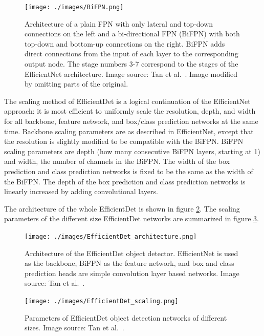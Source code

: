 \documentclass[english,twoside,openright]{HYgraduMLDS}
\begin{document}
\begin{figure}[h] 
\centering
\texttt{[image: ./images/BiFPN.png]}
\caption{Architecture of a plain FPN with only lateral and top-down connections on the left and a bi-directional FPN (BiFPN) with both top-down and bottom-up connections on the right. BiFPN adds direct connections from the input of each layer to the corresponding output node. The stage numbers 3-7 correspond to the stages of the EfficientNet architecture. Image source: Tan et al.~\cite{EfficientDet}. Image modified by omitting parts of the original.}
\label{fig:BiFPN} 
\end{figure}

The scaling method of EfficientDet is a logical continuation of the EfficientNet approach: it is most efficient to uniformly scale the resolution, depth, and width for all backbone, feature network, and box/class prediction networks at the same time. Backbone scaling parameters are as described in EfficientNet, except that the resolution is slightly modified to be compatible with the BiFPN. BiFPN scaling parameters are depth (how many consecutive BiFPN layers, starting at 1) and width, the number of channels in the BiFPN. The width of the box prediction and class prediction networks is fixed to be the same as the width of the BiFPN. The depth of the box prediction and class prediction networks is linearly increased by adding convolutional layers.  

The architecture of the whole EfficientDet is shown in figure \ref{fig:EfficientDet_architecture}. The scaling parameters of the different size EfficientDet networks are summarized in figure \ref{fig:EfficientDet_scaling}.

\begin{figure}[h] 
\centering
\texttt{[image: ./images/EfficientDet\_architecture.png]}
\caption{Architecture of the EfficientDet object detector. EfficientNet is used as the backbone, BiFPN as the feature network, and box and class prediction heads are simple convolution layer based networks. Image source: Tan et al.~\cite{EfficientDet}.}
\label{fig:EfficientDet_architecture} 
\end{figure}

\begin{figure}[h] 
\centering
\texttt{[image: ./images/EfficientDet\_scaling.png]}
\caption{Parameters of EfficientDet object detection networks of different sizes. Image source: Tan et al.~\cite{EfficientDet}.}
\label{fig:EfficientDet_scaling} 
\end{figure}
\end{document}
